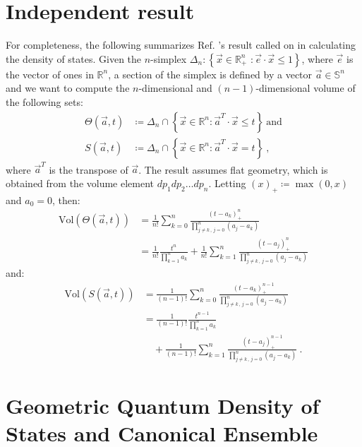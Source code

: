 \documentclass[draft,nofootinbib,pre,twocolumn,showpacs,showkeys,groupaddress,preprintnumbers,floatfix]{revtex4-1}
\newcommand{\1}{\mathbbm{1}}
\begin{document}
\appendix

\section{Independent result}
\label{sec:Lasserre}

For completeness, the following summarizes Ref. \cite{Lasserre2015}'s result
called on in calculating the density of states. Given the $n$-simplex
$\Delta_n: \left\{ \vec{x} \in \mathbb{R}^{n}_{+} \,\, : \vec{e} \cdot \vec{x}
\leq 1\right\}$, where $\vec{e}$ is the vector of ones in $\mathbb{R}^{n}$, a
section of the simplex is defined by a vector $\vec{a}\in \mathbb{S}^{n}$ and
we want to compute the $n$-dimensional and $(n-1)$-dimensional volume of the
following sets:
\begin{align*}
\Theta(\vec{a},t) & \coloneqq \Delta_n \cap
  \left\{ \vec{x} \in \mathbb{R}^{n} : \vec{a}^T \cdot \vec{x} \leq t\right\}
  ~\text{and} \\
S(\vec{a},t) & \coloneqq \Delta_n \cap
  \left\{ \vec{x} \in \mathbb{R}^{n} : \vec{a}^T \cdot \vec{x} = t\right\}
  ~,
\end{align*}
where $\vec{a}^T$ is the transpose of $\vec{a}$. The result assumes flat
geometry, which is obtained from the volume element $dp_1dp_2\ldots dp_n$.
Letting $(x)_{+}\coloneqq \max (0,x)$ and $a_0=0$, then:
\begin{align*}
\mathrm{Vol}\left( \Theta(\vec{a},t)\right)
  & = \frac{1}{n!} \sum_{k=0}^{n} \frac{(t-a_k)_{+}^{n}}{\prod_{j \neq k \,,\,
  j=0 }^n (a_j - a_k)} \\
  & = \frac{1}{n!} \frac{t^{n}}{\prod_{k=1}^{n} a_k} + \frac{1}{n!} \sum_{k =1}^{n} \frac{(t-a_j)_+^{n}}{\prod_{j \neq k \, , \, j=0}^n (a_j-a_k)}
\end{align*}
and:
\begin{align*}
\mathrm{Vol}\left( S(\vec{a},t)\right)
  & = \frac{1}{(n-1)!} \sum_{k=0}^{n} \frac{(t-a_k)_{+}^{n-1}}{\prod_{j \neq k
  \,,\, j=0 }^n (a_j - a_k)} \\
  & = \frac{1}{(n-1)!} \frac{t^{n-1}}{\prod_{k=1}^{n} a_k} \\
  & \quad + \frac{1}{(n-1)!} \sum_{k =1}^{n} \frac{(t-a_j)_+^{n-1}}{\prod_{j \neq k \, , \, j=0}^n (a_j-a_k)}
  ~.
\end{align*}

\section{Geometric Quantum Density of States and Canonical Ensemble}
\end{document}
